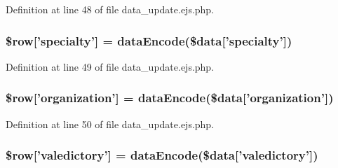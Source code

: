 \-Definition at line 48 of file data\-\_\-update.\-ejs.\-php.

\hypertarget{miscellaneous_2mysettings_2data__update_8ejs_8php_a303951ab220aee0016b1d2fe9c668eb9}{
\subsubsection[{\$row}]{\setlength{\rightskip}{0pt plus 5cm}\$row\mbox{[}'specialty'\mbox{]} = {\bf data\-Encode}(\$data\mbox{[}'specialty'\mbox{]})}}\label{miscellaneous_2mysettings_2data__update_8ejs_8php_a303951ab220aee0016b1d2fe9c668eb9}


\-Definition at line 49 of file data\-\_\-update.\-ejs.\-php.

\hypertarget{miscellaneous_2mysettings_2data__update_8ejs_8php_a69213631c5b3eaacd5809b9c8d3721c2}{
\subsubsection[{\$row}]{\setlength{\rightskip}{0pt plus 5cm}\$row\mbox{[}'organization'\mbox{]} = {\bf data\-Encode}(\$data\mbox{[}'organization'\mbox{]})}}\label{miscellaneous_2mysettings_2data__update_8ejs_8php_a69213631c5b3eaacd5809b9c8d3721c2}


\-Definition at line 50 of file data\-\_\-update.\-ejs.\-php.

\hypertarget{miscellaneous_2mysettings_2data__update_8ejs_8php_a03936db500530c616c892f3db51586a9}{
\subsubsection[{\$row}]{\setlength{\rightskip}{0pt plus 5cm}\$row\mbox{[}'valedictory'\mbox{]} = {\bf data\-Encode}(\$data\mbox{[}'valedictory'\mbox{]})}}\label{miscellaneous_2mysettings_2data__update_8ejs_8php_a03936db500530c616c892f3db51586a9}


